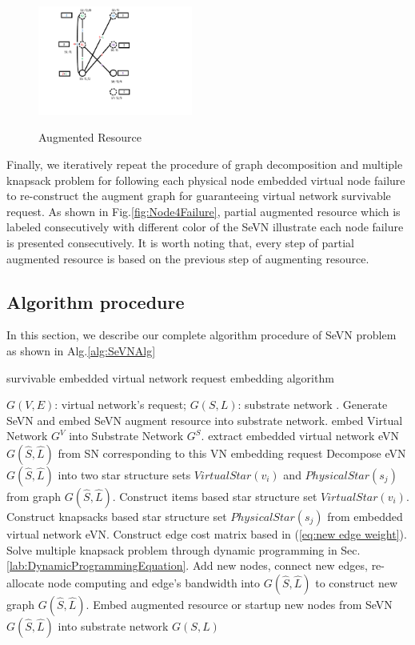 \begin{figure}
  \centering
  \includegraphics[width=2in]{Fig/AugmentResource}\\
  \caption{Augmented Resource}\label{fig:AugmentResource}
\end{figure}

Finally, we iteratively repeat the procedure of graph decomposition and multiple knapsack problem for  following each physical node embedded virtual node failure to re-construct the augment graph for guaranteeing virtual network survivable request. As shown in Fig.\ref{fig:Node4Failure}, partial augmented resource which is labeled consecutively with different color of the SeVN illustrate each node failure is presented consecutively. It is worth noting that, every step of partial augmented resource is based on the previous step of augmenting resource.

\subsection{Algorithm procedure}
In this section, we describe our complete algorithm procedure of SeVN problem as shown in Alg.\ref{alg:SeVNAlg}
\begin{algorithm}
\label{alg:SeVNAlg}
\caption{survivable embedded virtual network request embedding algorithm}
\begin{algorithmic}[1]
\REQUIRE $G (V,E)$: virtual network's request; $G (S,L)$: substrate network .
\ENSURE Generate SeVN and embed SeVN augment resource into substrate network.
\STATE embed Virtual Network $G^V$ into Substrate Network $G^S$\cite{liu2011completing}.
\STATE extract embedded virtual network eVN $G\left( {\hat S,\hat L} \right)$ from SN corresponding to this VN embedding request
\STATE Decompose eVN $G\left( {\hat S,\hat L} \right)$ into two star structure sets $VirtualStar(v_i)$ and $PhysicalStar(s_j)$ from graph $G\left( {\hat S,\hat L} \right)$.
\STATE Construct items based star structure set $VirtualStar(v_i)$.
\STATE Construct knapsacks based star structure set $PhysicalStar(s_j)$ from embedded virtual network eVN.
\STATE Construct edge cost matrix based in (\ref{eq:new edge weight}).
\STATE Solve multiple knapsack problem through dynamic programming in Sec.\ref{lab:DynamicProgrammingEquation}.
\STATE Add new nodes, connect new edges, re-allocate node computing and edge's bandwidth into $G\left( {\hat S,\hat L} \right)$ to construct new graph $G\left( {\hat S,\hat L} \right)$.
\ENDFOR
\STATE Embed augmented resource or startup new nodes from SeVN $G\left( {\hat S,\hat L} \right)$ into substrate network $G(S,L)$
\end{algorithmic}
\end{algorithm}

